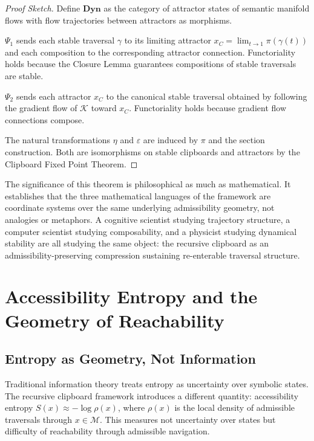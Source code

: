 \documentclass[12pt,oneside]{book}
\theoremstyle{plain}
\theoremstyle{definition}
\theoremstyle{plain}
\newcommand{\cM}{\mathcal{M}}
\begin{document}
\begin{proof}[Proof Sketch]
Define $\mathbf{Dyn}$ as the category of attractor states of semantic manifold flows with flow trajectories between attractors as morphisms.

$\Psi_1$ sends each stable traversal $\gamma$ to its limiting attractor $x_C = \lim_{t\to 1}\pi(\gamma(t))$ and each composition to the corresponding attractor connection. Functoriality holds because the Closure Lemma guarantees compositions of stable traversals are stable.

$\Psi_2$ sends each attractor $x_C$ to the canonical stable traversal obtained by following the gradient flow of $\mathcal{K}$ toward $x_C$. Functoriality holds because gradient flow connections compose.

The natural transformations $\eta$ and $\varepsilon$ are induced by $\pi$ and the section construction. Both are isomorphisms on stable clipboards and attractors by the Clipboard Fixed Point Theorem.
\end{proof}

The significance of this theorem is philosophical as much as mathematical. It establishes that the three mathematical languages of the framework are coordinate systems over the same underlying admissibility geometry, not analogies or metaphors. A cognitive scientist studying trajectory structure, a computer scientist studying composability, and a physicist studying dynamical stability are all studying the same object: the recursive clipboard as an admissibility-preserving compression sustaining re-enterable traversal structure.

\chapter{Accessibility Entropy and the Geometry of Reachability}
\label{ch:accessibility}

\section{Entropy as Geometry, Not Information}

Traditional information theory treats entropy as uncertainty over symbolic states. The recursive clipboard framework introduces a different quantity: accessibility entropy $S(x) \approx -\log\rho(x)$, where $\rho(x)$ is the local density of admissible traversals through $x \in \cM$. This measures not uncertainty over states but difficulty of reachability through admissible navigation.
\end{document}
